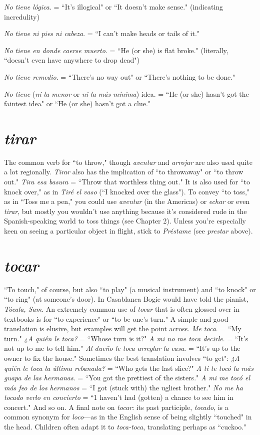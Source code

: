 \indu \emph{No tiene lógica}. = ``It's illogical" or ``It doesn't make sense."
(indicating incredulity)

\indu \emph{No tiene ni pies ni cabeza}. = ``I can't make heads or tails of it."

\indu \emph{No tiene en donde caerse muerto}. = ``He (or she) is flat
broke."
(literally, ``doesn't even have anywhere to drop dead")

\indu \emph{No tiene remedio}. = ``There's no way out" or ``There's nothing to be done."

\indu \emph{No tiene} (\emph{ni la menor} or \emph{ni la más mínima}) idea. = ``He (or
she) hasn't got the faintest idea" or ``He (or she) hasn't
got a clue."

\section{\emph{tirar}}

The common verb for ``to throw," though \emph{aventar} and \emph{arrojar}
are also used quite a lot regionally. \emph{Tirar} also has the implication of
``to throwaway" or ``to throw out." \emph{Tira esa basura} = ``Throw that
worthless thing out." It is also used for ``to knock over," as in \emph{Tiré el
vaso} (``I knocked over the glass"). To convey ``to toss," as in ``Toss me
a pen," you could use \emph{aventar} (in the Americas) or \emph{echar} or even \emph{tirar},
but mostly you wouldn't use anything because it's considered rude
in the Spanish-speaking world to toss things (see Chapter 2). Unless
you're especially keen on seeing a particular object in flight, stick to
\emph{Préstame} (see \emph{prestar} above).

\section{\emph{tocar}}

``To touch," of course, but also ``to play" (a musical instrument) and ``to knock" or ``to ring" (at someone's door). In Casablanca
Bogie would have told the pianist, \emph{Tócala, Sam}. An extremely common use of \emph{tocar} that is often glossed over in textbooks is for ``to experience" or ``to be one's turn." A simple and good translation is elusive,
but examples will get the point across. \emph{Me toca}. = ``My turn." \emph{¿A
quién le toca?} = ``Whose turn is it?" \emph{A mi no me toca decirle}. = ``It's
not up to me to tell him." \emph{Al dueño le toca arreglar la casa}. = ``It's
up to the owner to fix the house." Sometimes the best translation involves ``to get": \emph{¿A quién le toca la última rebanada?} = ``Who gets the
last slice?" \emph{A ti te tocó la más guapa de las hermanas}. = ``You got the
prettiest of the sisters." \emph{A mi me tocó el más feo de los hermanos} =
``I got (stuck with) the ugliest brother." \emph{No me ha tocado verlo en concierto} = ``1 haven't had (gotten) a chance to see him in concert." And
so on. A final note on \emph{tocar}: its past participle, \emph{tocado}, is a common
synonym for \emph{loco}---as in the English sense of being slightly ``touched"
in the head. Children often adapt it to \emph{toca-toca}, translating perhaps as
``cuckoo."

